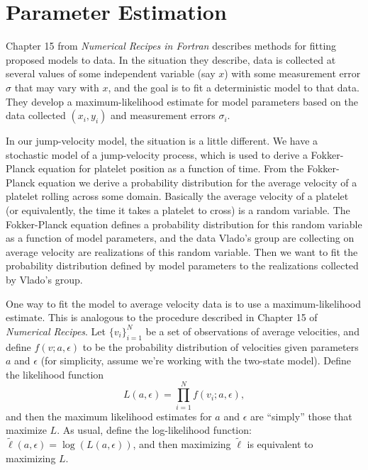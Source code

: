 \documentclass{article}
\begin{document}
\section{Parameter Estimation}
\label{sec:parameter-estimation}

Chapter 15 from \textit{Numerical Recipes in Fortran} describes
methods for fitting proposed models to data. In the situation they
describe, data is collected at several values of some independent
variable (say $x$) with some measurement error $\sigma$ that may vary
with $x$, and the goal is to fit a deterministic model to that
data. They develop a maximum-likelihood estimate for model parameters
based on the data collected $(x_i, y_i)$ and measurement errors
$\sigma_i$. 

In our jump-velocity model, the situation is a little different. We
have a stochastic model of a jump-velocity process, which is used to
derive a Fokker-Planck equation for platelet position as a function of
time. From the Fokker-Planck equation we derive a probability
distribution for the average velocity of a platelet rolling across
some domain. Basically the average velocity of a platelet (or
equivalently, the time it takes a platelet to cross) is a random
variable. The Fokker-Planck equation defines a probability
distribution for this random variable as a function of model
parameters, and the data Vlado's group are collecting on average
velocity are realizations of this random variable. Then we want to fit
the probability distribution defined by model parameters to the
realizations collected by Vlado's group.

One way to fit the model to average velocity data is to use a
maximum-likelihood estimate. This is analogous to the procedure
described in Chapter 15 of \textit{Numerical Recipes}. Let
$\{v_i\}_{i=1}^N$ be a set of observations of average velocities, and
define $f(v;a, \epsilon)$ to be the probability distribution of
velocities given parameters $a$ and $\epsilon$ (for simplicity, assume
we're working with the two-state model). Define the likelihood
function
\begin{equation}
  \label{eq:likelihood}
  L(a, \epsilon) = \prod_{i=1}^N f(v_i; a, \epsilon),
\end{equation}
and then the maximum likelihood estimates for $a$ and $\epsilon$ are
``simply'' those that maximize $L$. As usual, define the
log-likelihood function: $\tilde{\ell}(a, \epsilon) = \log(L(a, \epsilon))$,
and then maximizing $\tilde{\ell}$ is equivalent to maximizing $L$.
\end{document}
